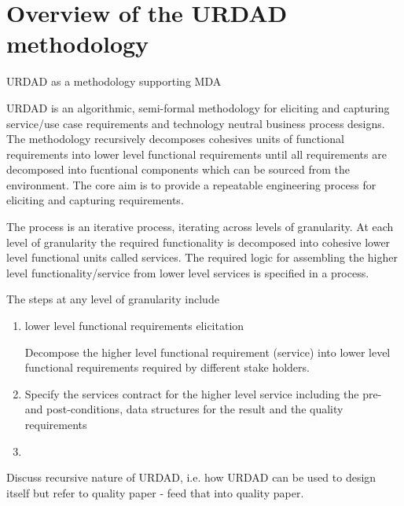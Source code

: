 \section{Overview of the URDAD methodology \label{sec:urdadMethodology}}

URDAD as a methodology supporting MDA

URDAD is an algorithmic, semi-formal methodology for eliciting and capturing service/use case requirements and technology neutral business process designs\cite{solms_urdad_2010}. The methodology recursively decomposes cohesives units of functional requirements into lower level functional requirements until all requirements are decomposed into fucntional components which can be sourced from the environment. The core aim is to provide a repeatable engineering process for eliciting and capturing requirements. 

The process is an iterative process, iterating across levels of granularity. At each level of granularity the required functionality is decomposed into cohesive lower level functional units called services. The required logic for assembling the higher level functionality/service from lower level services is specified in a process.

The steps at any level of granularity include
\begin{enumerate}
 \item lower level {functional requirements elicitation}
 
Decompose the higher level functional requirement (service) into lower level functional requirements required by different stake holders.
 \item Specify the services contract for the higher level service including the pre- and post-conditions, data structures for the result and the quality requirements
 \item 
\end{enumerate}

Discuss recursive nature of URDAD, i.e. how URDAD can be used to design itself but refer to quality paper - feed that into quality paper.

